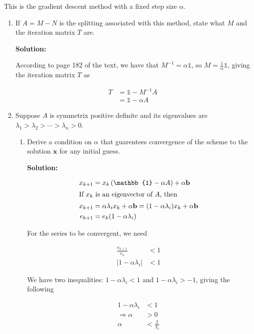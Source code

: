 \documentclass[12pt]{article}
\newcommand{\abs}[1]{\left| #1 \right|}
\newcommand{\vect}{\mathbf}
\newcommand{\Id}{\mathbb{1}}
\newcommand{\inv}[1]{ #1^{-1}}
\begin{document}
\begin{enumerate}
This is the gradient descent method with a fixed step size $\alpha$.

\begin{enumerate}
  \item If $A = M - N$ is the splitting associated with this method, state what $M$
  and the iteration matrix $T$ are.

  {\bf Solution:}

  According to page 182 of the text, we have that $\inv{M} = \alpha \Id$, so $M = \frac{1}{\alpha}\Id$,
  giving the iteration matrix $T$ as

  \begin{align*}
    T &= \Id - \inv{M}A\\
      &= \Id - \alpha A
  \end{align*}

  \item Suppose $A$ is symmetrix positive definite and its eigenvalues are
  $\lambda_{1} > \lambda_{2} > \cdots > \lambda_{n} > 0$.

  \begin{enumerate}
    \item Derive a condition on $\alpha$ that guarentees convergence of the
    scheme to the solution $\mathbf{x}$ for any initial guess.

    {\bf Solution:}

    \begin{align*}
      x_{k+1} &= x_{k}\left( \Id - \alpha A\right) + \alpha \vect{b}\\
      \intertext{If $x_{k}$ is an eigenvector of $A$, then}
      x_{k+1} &= \alpha \lambda_{i} x_{k} + \alpha \vect{b} = (1 - \alpha \lambda_{i})x_{k} + \alpha \vect{b}\\
      e_{k+1} &= e_{k}(1 - \alpha \lambda_{i})
    \end{align*}

    For the series to be convergent, we need

    \begin{align*}
      \frac{e_{k+1}}{e_{k}} &< 1\\
      \abs{1 - \alpha \lambda_{i}} &< 1
    \end{align*}

    We have two inequalities: $1 - \alpha \lambda_{i} < 1$ and $1 - \alpha \lambda_{i} > -1$, giving the following

    \begin{align*}
      1 - \alpha \lambda_{i} &< 1\\
      \Rightarrow \alpha &> 0\\
      \alpha &< \frac{2}{\lambda_{i}}
    \end{align*}


\end{enumerate}
\end{enumerate}
\end{enumerate}
\end{document}
